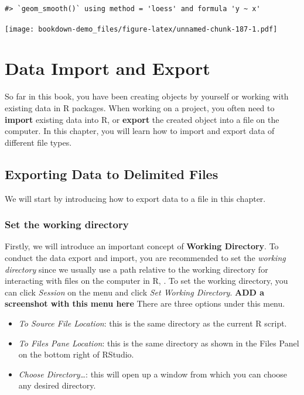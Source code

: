 \documentclass[
]{book}
\providecommand{\tightlist}{%
  \setlength{\itemsep}{0pt}\setlength{\parskip}{0pt}}
\begin{document}
\begin{verbatim}
#> `geom_smooth()` using method = 'loess' and formula 'y ~ x'
\end{verbatim}

\texttt{[image: bookdown-demo\_files/figure-latex/unnamed-chunk-187-1.pdf]}

\hypertarget{import-export}{%
\chapter{Data Import and Export}\label{import-export}}

So far in this book, you have been creating objects by yourself or working with existing data in R packages. When working on a project, you often need to \textbf{import} existing data into R, or \textbf{export} the created object into a file on the computer. In this chapter, you will learn how to import and export data of different file types.

\hypertarget{export-data}{%
\section{Exporting Data to Delimited Files}\label{export-data}}

We will start by introducing how to export data to a file in this chapter.

\hypertarget{set-the-working-directory}{%
\subsection{Set the working directory}\label{set-the-working-directory}}

Firstly, we will introduce an important concept of \textbf{Working Directory}. To conduct the data export and import, you are recommended to set the \emph{working directory} since we usually use a path relative to the working directory for interacting with files on the computer in R, . To set the working directory, you can click \emph{Session} on the menu and click \emph{Set Working Directory}. \textbf{ADD a screenshot with this menu here} There are three options under this menu.

\begin{itemize}
\tightlist
\item
  \emph{To Source File Location}: this is the same directory as the current R script.
\item
  \emph{To Files Pane Location}: this is the same directory as shown in the Files Panel on the bottom right of RStudio.
\item
  \emph{Choose Directory\ldots{}}: this will open up a window from which you can choose any desired directory.
\end{itemize}
\end{document}
